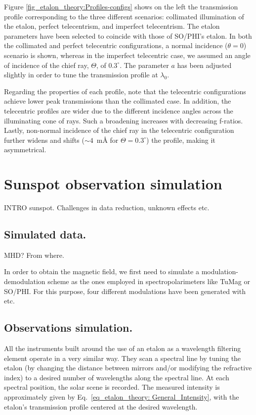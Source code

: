 Figure \ref{fig_etalon_theory:Profiles-configs} shows on the left the transmission profile corresponding to the three different scenarios: collimated illumination of the etalon, perfect telecentrism, and imperfect telecentrism. The etalon parameters have been selected to coincide with those of SO/PHI's etalon. In both the collimated and perfect telecentric configurations, a normal incidence  ($\theta = 0$) scenario is shown, whereas in the imperfect telecentric case, we assumed an angle of incidence of the chief ray, $\Theta$, of $0.3^{\circ}$. The parameter $a$ has been adjusted slightly in order to tune the transmission profile at $\lambda _ 0$. 

Regarding the properties of each profile, note that the telecentric configurations achieve lower peak transmissions than the collimated case. In addition, the telecentric profiles are wider due to the different incidence angles across the illuminating cone of rays. Such a broadening increases with decreasing f-ratios. Lastly, non-normal incidence of the chief ray in the telecentric configuration further widens and shifts ($\sim 4$~m\r{A}
for $\Theta=0.3^\circ$) the profile, making it asymmetrical. 

\section{Sunspot observation simulation}
INTRO sunspot. Challenges in data reduction, unknown effects etc. 

\subsection{Simulated data.}

MHD? From where.  


In order to obtain the magnetic field, we first need to simulate a modulation-demodulation scheme as the ones employed in spectropolarimeters like TuMag or SO/PHI. For this purpose, four different modulations have been generated with etc. 

\subsection{Observations simulation.}

All the instruments built around the use of an etalon as a wavelength filtering element operate in a very similar way. They scan a spectral line by tuning the etalon (by changing the distance between mirrors and/or modifying the refractive index) to a desired number of wavelengths along the spectral line. At each spectral position, the solar scene is recorded. The measured intensity is approximately given by Eq.~\eqref{eq_etalon_theory: General_Intensity}, with the etalon's transmission profile centered at the desired wavelength.

